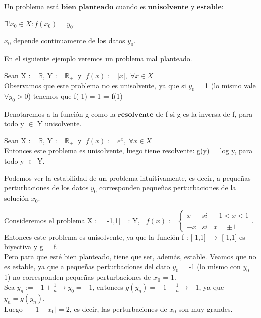 \begin{ndef}
Un problema está $\textbf{bien planteado}$ cuando es $\textbf{unisolvente}$ y $\textbf{estable}$:
	\begin{nlist}
	\item $\exists ! x_0 \in X : f(x_0) = y_0$.
	\item $x_0$ depende continuamente de los datos $y_0$.
	\end{nlist}
\end{ndef}

En el siguiente ejemplo veremos un problema mal planteado.

\begin{ejemplo}
Sean X := $\mathbb{R}$, Y := $\mathbb{R}_+ \;$ y $\; f(x) := \vert x \vert , \; \forall x \in X$\\
Observamos que este problema no es unisolvente, ya que si $y_0$ = 1 (lo mismo vale $\forall y_0 > 0$) tenemos que f(-1) = 1 = f(1)
\end{ejemplo}

\begin{ndef}[Resolvente]
Denotaremos a la función g como la $\textbf{resolvente}$ de f si g es la inversa de f, para todo y $\in$ Y unisolvente.
\end{ndef}

\begin{ejemplo}
Sean X := $\mathbb{R}$, Y := $\mathbb{R}_+ \;$ y $\; f(x) := e^x , \; \forall x \in X$\\
Entonces este problema es unisolvente, luego tiene resolvente: g(y) = log y, para todo y $\in$ Y.
\end{ejemplo}

Podemos ver la estabilidad de un problema intuitivamente, es decir, a pequeñas perturbaciones de los datos $y_0$ corresponden pequeñas perturbaciones de la solución $x_0$.

\begin{ejemplo}
Consideremos el problema X := [-1,1] =: Y, $\;$
$
f(x) := \left\{ \begin{array}{lcc}
x & si & -1 < x < 1 \\
\\ -x & si & x = \pm 1
\end{array}
\right.
$.\\
Entonces este problema es unisolvente, ya que la función f :  [-1,1] $\rightarrow$ [-1,1] es biyectiva y g = f.\\
Pero para que esté bien planteado, tiene que ser, además, estable. Veamos que no es estable, ya que a pequeñas perturbaciones del dato $y_0$ = -1 (lo mismo con $y_0$ = 1) no corresponden pequeñas perturbaciones de $x_0$ = 1.\\
Sea $y_n := -1 + \frac{1}{n} \rightarrow y_0 = -1$, entonces $g(y_n) = -1 + \frac{1}{n} \rightarrow -1$, ya que $y_n = g(y_n)$.\\
Luego $\vert -1 - x_0 \vert = 2$, es decir, las perturbaciones de $x_0$ son muy grandes.
\end{ejemplo}


